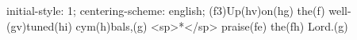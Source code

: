 initial-style: 1;
centering-scheme: english;
(f3)Up(hv)on(hg) the(f) well-(gv)tuned(hi) cym(h)bals,(g) <sp>*</sp> praise(fe) the(fh) Lord.(g)
